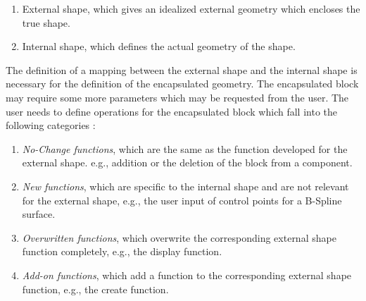 		\begin{enumerate}
		\item
		External shape, which gives an idealized external geometry which
		encloses the true shape.
		\item
		Internal shape, which defines the actual geometry of the shape.
		\end{enumerate}

	The definition of a mapping between the external shape and the internal 
	shape is necessary for the definition of the encapsulated geometry.
	The encapsulated block may require some more parameters which may be
	requested from the user. The user needs to define operations for the
	encapsulated block which fall into the following categories :
		\begin{enumerate}
		\item
		{\em No-Change functions}, which are the same as the function
		developed for the external shape. e.g., addition or the
		deletion of the block from a component.
		\item
		{\em New functions}, which are specific to the internal shape and
		are not relevant for the external shape, e.g., the user input
		of control points for a B-Spline surface.
		\item
		{\em Overwritten functions}, which overwrite the corresponding 
		external shape function completely, e.g., the display function.
		\item
		{\em Add-on functions}, which add a function to the corresponding
		external shape function, e.g., the create function.
		\end{enumerate}

